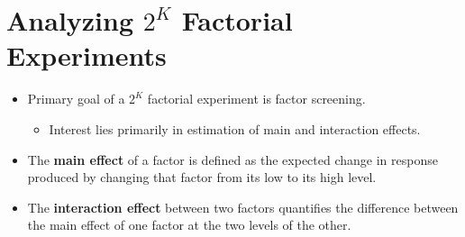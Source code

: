 \section{Analyzing \texorpdfstring{$ 2^K $}{2K} Factorial Experiments}
\begin{itemize}
    \item Primary goal of a $2^K$ factorial experiment is factor screening.
          \begin{itemize}
              \item Interest lies primarily in estimation of main and interaction effects.
          \end{itemize}
\end{itemize}
\begin{itemize}[*]
    \item The \textbf{main effect} of a factor is defined as the expected change in response produced by changing that factor from
          its low to its high level.
    \item The \textbf{interaction effect} between two factors quantifies the difference between the main effect of one
          factor at the two levels of the other.
\end{itemize}
